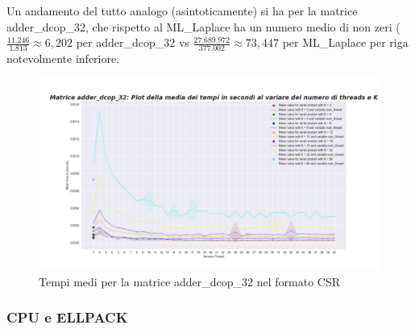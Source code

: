 \documentclass{article}
\begin{document}
Un andamento del tutto analogo (asintoticamente) si ha per la matrice adder\_dcop\_32, che rispetto al ML\_Laplace ha un numero medio di non zeri ($\frac{11.246}{1.813} \approx  6,202$ per adder\_dcop\_32  vs $\frac{27.689.972}{377.002} \approx  73,447$ per ML\_Laplace per riga notevolmente inferiore.  

\begin{figure}[H]
\centering
\includegraphics[width=\textwidth]{Immagini/CSR_CPU_adder_dcop_32.png}
\caption{Tempi medi per la matrice adder\_dcop\_32 nel formato CSR}
\end{figure}

\subsubsection{CPU e ELLPACK}
\end{document}
